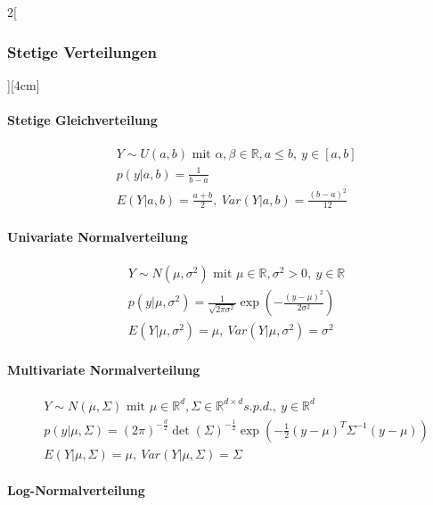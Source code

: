 \documentclass[8pt]{extarticle}
\begin{document}
\begin{multicols}{2}[\subsubsection{Stetige Verteilungen}][4cm]

	\paragraph{Stetige Gleichverteilung}
  
    \begin{align*}
    & Y \sim U(a,b) \text{ mit } \alpha, \beta \in \mathbb{R}, a \le b,\: y \in \left[a,b\right] \\
    & p(y|a,b) =\frac{1}{b-a} \\
    & E(Y|a,b) = \frac{a+b}{2} ,\: Var(Y|a,b) = \frac{(b-a)^2}{12}
  \end{align*}
  
    \paragraph{Univariate Normalverteilung}
  
    \begin{align*}
    & Y \sim N(\mu, \sigma^2) \text{ mit } \mu \in \mathbb{R}, \sigma^2 > 0,\: y \in \mathbb{R} \\
    & p(y|\mu, \sigma^2) =\frac{1}{\sqrt{2\pi\sigma^2}} \exp \left(-\frac{(y-\mu)^2}{2 \sigma^2} \right) \\
    & E(Y|\mu, \sigma^2) = \mu ,\: Var(Y|\mu, \sigma^2) = \sigma^2
  \end{align*}
  
    \paragraph{Multivariate Normalverteilung}
  
    \begin{align*}
    & Y \sim N(\mu, \Sigma) \text{ mit } \mu \in \mathbb{R}^d, \Sigma \in \mathbb{R}^{d\times d} s.p.d.,\: y \in \mathbb{R}^d \\
    & p(y|\mu, \Sigma) = (2\pi)^{-\frac{d}{2}} \det (\Sigma)^{-\frac{1}{2}} \exp \left( -\frac{1}{2}(y-\mu)^{T} \Sigma^{-1}(y-\mu)\right) \\
    & E(Y|\mu, \Sigma) = \mu ,\: Var(Y|\mu, \Sigma) = \Sigma
  \end{align*}
  
    \paragraph{Log-Normalverteilung}
  

\end{multicols}
\end{document}
